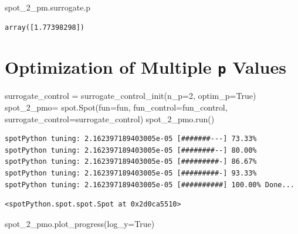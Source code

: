 \documentclass[
  letterpaper,
  DIV=11,
  numbers=noendperiod]{scrreprt}
\newenvironment{Shaded}{\begin{snugshade}}{\end{snugshade}}
\newcommand{\DecValTok}[1]{\textcolor[rgb]{0.68,0.00,0.00}{#1}}
\newcommand{\NormalTok}[1]{\textcolor[rgb]{0.00,0.23,0.31}{#1}}
\newcommand{\OperatorTok}[1]{\textcolor[rgb]{0.37,0.37,0.37}{#1}}
\newcommand{\VariableTok}[1]{\textcolor[rgb]{0.07,0.07,0.07}{#1}}
\begin{document}
\begin{Shaded}
\begin{Highlighting}[]
\NormalTok{spot\_2\_pm.surrogate.p}
\end{Highlighting}
\end{Shaded}

\begin{verbatim}
array([1.77398298])
\end{verbatim}

\section{\texorpdfstring{Optimization of Multiple \texttt{p}
Values}{Optimization of Multiple p Values}}\label{optimization-of-multiple-p-values}

\begin{Shaded}
\begin{Highlighting}[]
\NormalTok{surrogate\_control }\OperatorTok{=}\NormalTok{ surrogate\_control\_init(n\_p}\OperatorTok{=}\DecValTok{2}\NormalTok{,}
\NormalTok{                                           optim\_p}\OperatorTok{=}\VariableTok{True}\NormalTok{)}
\NormalTok{spot\_2\_pmo}\OperatorTok{=}\NormalTok{ spot.Spot(fun}\OperatorTok{=}\NormalTok{fun,}
\NormalTok{                    fun\_control}\OperatorTok{=}\NormalTok{fun\_control,}
\NormalTok{                    surrogate\_control}\OperatorTok{=}\NormalTok{surrogate\_control)}
\NormalTok{spot\_2\_pmo.run()}
\end{Highlighting}
\end{Shaded}

\begin{verbatim}
spotPython tuning: 2.162397189403005e-05 [#######---] 73.33% 
spotPython tuning: 2.162397189403005e-05 [########--] 80.00% 
spotPython tuning: 2.162397189403005e-05 [#########-] 86.67% 
spotPython tuning: 2.162397189403005e-05 [#########-] 93.33% 
spotPython tuning: 2.162397189403005e-05 [##########] 100.00% Done...
\end{verbatim}

\begin{verbatim}
<spotPython.spot.spot.Spot at 0x2d0ca5510>
\end{verbatim}

\begin{Shaded}
\begin{Highlighting}[]
\NormalTok{spot\_2\_pmo.plot\_progress(log\_y}\OperatorTok{=}\VariableTok{True}\NormalTok{)}
\end{Highlighting}
\end{Shaded}
\end{document}
